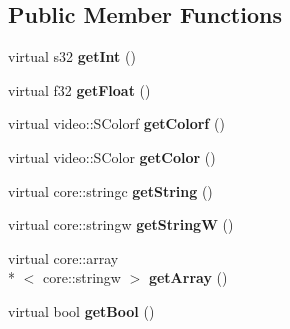\subsection*{Public Member Functions}
\begin{DoxyCompactItemize}
\item 
\hypertarget{classirr_1_1io_1_1_i_attribute_ae733ed49c2473f3908c2dffb250da0a8}{virtual s32 {\bfseries get\-Int} ()}\label{classirr_1_1io_1_1_i_attribute_ae733ed49c2473f3908c2dffb250da0a8}

\item 
\hypertarget{classirr_1_1io_1_1_i_attribute_af3e8374d058da8adfa6418169a0e691a}{virtual f32 {\bfseries get\-Float} ()}\label{classirr_1_1io_1_1_i_attribute_af3e8374d058da8adfa6418169a0e691a}

\item 
\hypertarget{classirr_1_1io_1_1_i_attribute_a95e5a767d1d32c50484c8dfcc31d3318}{virtual video\-::\-S\-Colorf {\bfseries get\-Colorf} ()}\label{classirr_1_1io_1_1_i_attribute_a95e5a767d1d32c50484c8dfcc31d3318}

\item 
\hypertarget{classirr_1_1io_1_1_i_attribute_af9f6d2dcedd87b35ba6ebb5ff615ebac}{virtual video\-::\-S\-Color {\bfseries get\-Color} ()}\label{classirr_1_1io_1_1_i_attribute_af9f6d2dcedd87b35ba6ebb5ff615ebac}

\item 
\hypertarget{classirr_1_1io_1_1_i_attribute_a6024829986811cc553c2f8e3a57fe123}{virtual core\-::stringc {\bfseries get\-String} ()}\label{classirr_1_1io_1_1_i_attribute_a6024829986811cc553c2f8e3a57fe123}

\item 
\hypertarget{classirr_1_1io_1_1_i_attribute_acdc88af0434a1343a3bce93f7aa5b50b}{virtual core\-::stringw {\bfseries get\-String\-W} ()}\label{classirr_1_1io_1_1_i_attribute_acdc88af0434a1343a3bce93f7aa5b50b}

\item 
\hypertarget{classirr_1_1io_1_1_i_attribute_a478795df6ab6dabfdff07f99a0adf70d}{virtual core\-::array\\*
$<$ core\-::stringw $>$ {\bfseries get\-Array} ()}\label{classirr_1_1io_1_1_i_attribute_a478795df6ab6dabfdff07f99a0adf70d}

\item 
\hypertarget{classirr_1_1io_1_1_i_attribute_abe00d10ada00648bc72671783e96f1db}{virtual bool {\bfseries get\-Bool} ()}\label{classirr_1_1io_1_1_i_attribute_abe00d10ada00648bc72671783e96f1db}


\end{DoxyCompactItemize}
